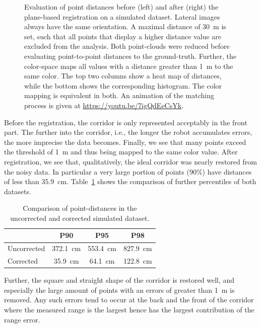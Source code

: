\documentclass[5p]{elsarticle}
\begin{document}
\begin{figure}
\begin{minipage}[c]{0.495\textwidth}
  	\end{minipage} 	
 	\caption{Evaluation of point distances before (left) and after (right) the plane-based registration on a simulated dataset. Lateral images always have the same orientation. A maximal distance of \SI{30}{m} is set, such that all points that display a higher distance value are excluded from the analysis. Both point-clouds were reduced before evaluating point-to-point distances to the ground-truth. Further, the color-space maps all values with a distance greater than \SI{1}{m} to the same color. The top two columns show a heat map of distances, while the bottom shows the corresponding histogram. The color mapping is equivalent in both. An animation of the matching process is given at \url{https://youtu.be/7igQdEeCsYk}.} 
 	\label{fig:simulatedEvaluation}
\end{figure} 

Before the registration, the corridor is only represented acceptably in the front part. 
The further into the corridor, i.e., the longer the robot accumulates errors, the more imprecise the data becomes. 
Finally, we see that many points exceed the threshold of \SI{1}{\meter} and thus being mapped to the same color value.
After registration, we see that, qualitatively, the ideal corridor was nearly restored from the noisy data. 
In particular a very large portion of points (90\%) have distances of less than \SI{35.9}{\centi\meter}.
Table~\ref{tab:percentiles} shows the comparison of further percentiles of both datasets. 

\begin{table}
	\centering
	\begin{tabular}{@{}lccc@{}}\hline
		& P90 & P95 & P98 \\ \hline\hline
		Uncorrected & \SI{372.1}{\centi\meter} &  \SI{553.4}{\centi\meter} &  \SI{827.9}{\centi\meter} \\%
		Corrected & \SI{35.9}{\centi\meter} &  \SI{64.1}{\centi\meter} &  \SI{122.8}{\centi\meter} \\\hline%
	\end{tabular}
	\caption{Comparison of point-distances in the uncorrected and corrected simulated dataset.}
	\label{tab:percentiles}
\end{table}

Further, the square and straight shape of the corridor is restored well, and especially the large amount of points with an errors of greater than \SI{1}{m} is removed. 
Any such errors tend to occur at the back and the front of the corridor where the measured range is the largest hence has the largest contribution of the range error. 
\end{document}
